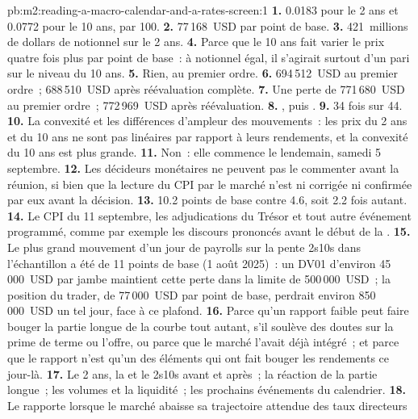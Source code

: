 \begin{solution}{pb:m2:reading-a-macro-calendar-and-a-rates-screen:1}
\textbf{1.} 0.0183 pour le 2 ans et 0.0772 pour le 10 ans, par 100.
\textbf{2.} 77\,168~USD par point de base.
\textbf{3.} 421~millions de dollars de notionnel sur le 2 ans.
\textbf{4.} Parce que le 10 ans fait varier le prix quatre fois plus par point de base~:
à notionnel égal, il s'agirait surtout d'un pari sur le niveau du 10 ans.
\textbf{5.} Rien, au premier ordre.
\textbf{6.} 694\,512~USD au premier ordre~; 688\,510~USD après réévaluation complète.
\textbf{7.} Une perte de 771\,680~USD au premier ordre~; 772\,969~USD après réévaluation.
\textbf{8.} , puis .
\textbf{9.} 34 fois sur 44.
\textbf{10.} La convexité et les différences d'ampleur des mouvements~: les prix du 2 ans et du 10 ans
ne sont pas linéaires par rapport à leurs rendements, et la convexité du 10 ans est plus grande.
\textbf{11.} Non~: elle commence le lendemain, samedi 5 septembre.
\textbf{12.} Les décideurs monétaires ne peuvent pas le commenter avant la réunion, si bien que la lecture
du CPI par le marché n'est ni corrigée ni confirmée par eux avant la décision.
\textbf{13.} 10.2 points de base contre 4.6, soit 2.2 fois autant.
\textbf{14.} Le CPI du 11 septembre, les adjudications du Trésor et tout autre événement programmé, comme
par exemple les discours prononcés avant le début de la .
\textbf{15.} Le plus grand mouvement d'un jour de payrolls sur la pente 2s10s dans l'échantillon a été de 11 points
de base (1 août 2025)~: un DV01 d'environ 45\,000~USD par jambe maintient cette perte dans
la limite de 500\,000~USD~; la position du trader, de 77\,000~USD par point de base, perdrait environ 850\,000~USD un tel jour, face à ce plafond.
\textbf{16.} Parce qu'un rapport faible peut faire bouger la partie longue de la courbe tout autant, s'il soulève des doutes sur
la prime de terme ou l'offre, ou parce que le marché l'avait déjà intégré~; et parce que le
rapport n'est qu'un des éléments qui ont fait bouger les rendements ce jour-là.
\textbf{17.} Le 2 ans, la  et le 2s10s avant et après~; la réaction
de la partie longue~; les volumes et la liquidité~; les prochains événements du calendrier.
\textbf{18.} Le  rapporte lorsque le marché abaisse sa trajectoire attendue des taux directeurs

\end{solution}
